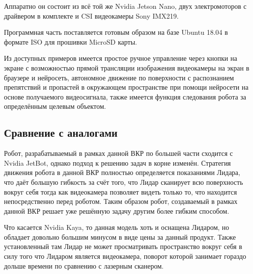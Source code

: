 Аппаратно он состоит из всё той же Nvidia Jetson Nano, двух электромоторов с драйвером в комплекте и CSI видеокамеры Sony IMX219.

Программная часть поставляется готовым образом на базе Ubuntu 18.04 в формате ISO для прошивки MicroSD карты.

Из доступных примеров имеется простое ручное управление через кнопки на экране с возможностью прямой трансляции изображения видеокамеры на экран в браузере и нейросеть, автономное движение по поверхности с распознанием препятствий и пропастей в окружающем пространстве при помощи нейросети на основе получаемого видеосигнала, также имеется функция следования робота за определённым целевым объектом\cite{jetbot-examples}.

\subsection{Сравнение с аналогами}
Робот, разрабатываемый в рамках данной ВКР по большей части сходится с Nvidia JetBot, однако подход к решению задач в корне изменён. Стратегия движения робота в данной ВКР полностью определяется показаниями Лидара, что даёт большую гибкость за счёт того, что Лидар сканирует всю поверхность вокруг себя тогда как видеокамера позволяет видеть только то, что находится непосредственно перед роботом. Таким образом робот, создаваемый в рамках данной ВКР решает уже решённую задачу другим более гибким способом.

Что касается Nvidia Kaya, то данная модель хоть и оснащена Лидаром, но обладает довольно большим минусом в виде цены за данный продукт. Также установленный там Лидар не может просматривать пространство вокруг себя в силу того что Лидаром является видеокамера, поворот которой занимает гораздо дольше времени по сравнению с лазерным сканером.

\FloatBarrier

